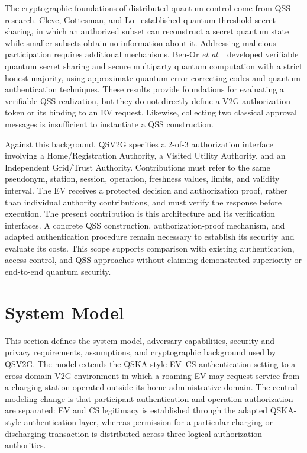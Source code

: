 \documentclass[twocolumn,10pt,journal]{IEEEtran}
\begin{document}
The cryptographic foundations of distributed quantum control come from QSS research. Cleve, Gottesman, and Lo~\cite{cleve1999quantum} established quantum threshold secret sharing, in which an authorized subset can reconstruct a secret quantum state while smaller subsets obtain no information about it. Addressing malicious participation requires additional mechanisms. Ben-Or \emph{et al.}~\cite{benor2006vqss} developed verifiable quantum secret sharing and secure multiparty quantum computation with a strict honest majority, using approximate quantum error-correcting codes and quantum authentication techniques. These results provide foundations for evaluating a verifiable-QSS realization, but they do not directly define a V2G authorization token or its binding to an EV request. Likewise, collecting two classical approval messages is insufficient to instantiate a QSS construction.

Against this background, QSV2G specifies a 2-of-3 authorization interface involving a Home/Registration Authority, a Visited Utility Authority, and an Independent Grid/Trust Authority. Contributions must refer to the same pseudonym, station, session, operation, freshness values, limits, and validity interval. The EV receives a protected decision and authorization proof, rather than individual authority contributions, and must verify the response before execution. The present contribution is this architecture and its verification interfaces. A concrete QSS construction, authorization-proof mechanism, and adapted authentication procedure remain necessary to establish its security and evaluate its costs. This scope supports comparison with existing authentication, access-control, and QSS approaches without claiming demonstrated superiority or end-to-end quantum security.

\section{System Model} \label{sec3}
This section defines the system model, adversary capabilities, security and privacy requirements, assumptions, and cryptographic background used by QSV2G. The model extends the QSKA-style EV--CS authentication setting to a cross-domain V2G environment in which a roaming EV may request service from a charging station operated outside its home administrative domain. The central modeling change is that participant authentication and operation authorization are separated: EV and CS legitimacy is established through the adapted QSKA-style authentication layer, whereas permission for a particular charging or discharging transaction is distributed across three logical authorization authorities.
\end{document}
